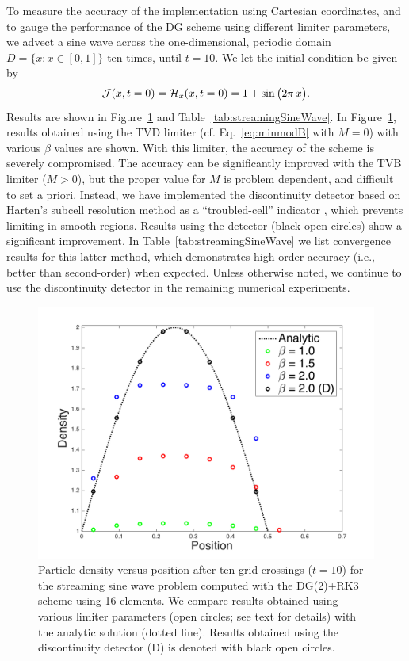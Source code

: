 \documentclass[10pt,preprint]{aastex}
\begin{document}
To measure the accuracy of the implementation using Cartesian coordinates, and to gauge the performance of the DG scheme using different limiter parameters, we advect a sine wave across the one-dimensional, periodic domain $D=\{x:x\in[0,1]\}$ ten times, until $t=10$.  
We let the initial condition be given by
\begin{equation}
  \mathcal{J}(x,t=0)=\mathcal{H}_{x}(x,t=0)=1+\sin\big(2\pi\,x\big).  
\end{equation}
Results are shown in Figure~\ref{fig:streamingSineWave} and Table~\ref{tab:streamingSineWave}.  
In Figure~\ref{fig:streamingSineWave}, results obtained using the TVD limiter (cf. Eq.~\eqref{eq:minmodB} with $M=0$) with various $\beta$ values are shown.  
With this limiter, the accuracy of the scheme is severely compromised.  
The accuracy can be significantly improved with the TVB limiter ($M>0$), but the proper value for $M$ is problem dependent, and difficult to set a priori.  
Instead, we have implemented the discontinuity detector based on Harten's subcell resolution method as a ``troubled-cell'' indicator \citep{harten_1989,qiuShu_2005}, which prevents limiting in smooth regions.  
Results using the detector (black open circles) show a significant improvement.  
In Table~\ref{tab:streamingSineWave} we list convergence results for this latter method, which demonstrates high-order accuracy (i.e., better than second-order) when expected.  
Unless otherwise noted, we continue to use the discontinuity detector in the remaining numerical experiments.  

\begin{figure}
  \begin{center}
    \includegraphics[scale=0.78]{./Figures/StreamingSineWave1D}
  \end{center}
  \caption{Particle density versus position after ten grid crossings ($t=10$) for the streaming sine wave problem computed with the DG(2)+RK3 scheme using 16 elements.  
  We compare results obtained using various limiter parameters (open circles; see text for details) with the analytic solution (dotted line).  
  Results obtained using the discontinuity detector (D) is denoted with black open circles.}
  \label{fig:streamingSineWave}
\end{figure}
\end{document}
